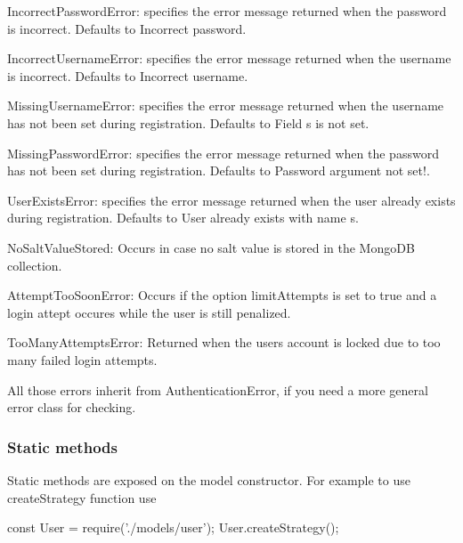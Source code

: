 \begin{DoxyItemize}
\item {\ttfamily Incorrect\+Password\+Error}\+: specifies the error message returned when the password is incorrect. Defaults to \textquotesingle{}Incorrect password\textquotesingle{}.
\item {\ttfamily Incorrect\+Username\+Error}\+: specifies the error message returned when the username is incorrect. Defaults to \textquotesingle{}Incorrect username\textquotesingle{}.
\item {\ttfamily Missing\+Username\+Error}\+: specifies the error message returned when the username has not been set during registration. Defaults to \textquotesingle{}Field s is not set\textquotesingle{}.
\item {\ttfamily Missing\+Password\+Error}\+: specifies the error message returned when the password has not been set during registration. Defaults to \textquotesingle{}Password argument not set!\textquotesingle{}.
\item {\ttfamily User\+Exists\+Error}\+: specifies the error message returned when the user already exists during registration. Defaults to \textquotesingle{}User already exists with name s\textquotesingle{}.
\item {\ttfamily No\+Salt\+Value\+Stored}\+: Occurs in case no salt value is stored in the Mongo\+DB collection.
\item {\ttfamily Attempt\+Too\+Soon\+Error}\+: Occurs if the option {\ttfamily limit\+Attempts} is set to true and a login attept occures while the user is still penalized.
\item {\ttfamily Too\+Many\+Attempts\+Error}\+: Returned when the user\textquotesingle{}s account is locked due to too many failed login attempts.
\end{DoxyItemize}

All those errors inherit from {\ttfamily Authentication\+Error}, if you need a more general error class for checking.

\subsubsection*{Static methods}

Static methods are exposed on the model constructor. For example to use create\+Strategy function use


\begin{DoxyCode}
const User = require('./models/user');
User.createStrategy();
\end{DoxyCode}



